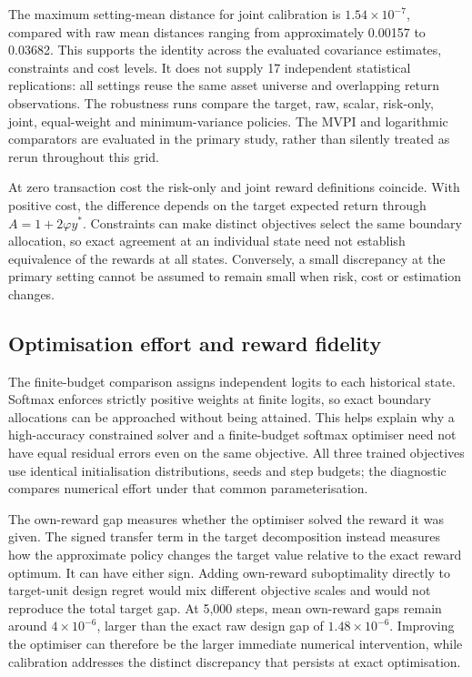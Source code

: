\documentclass[sigconf,anonymous,review]{acmart}
\begin{document}
The maximum setting-mean distance for joint calibration is $1.54\times10^{-7}$, compared with raw mean distances ranging from approximately 0.00157 to 0.03682. This supports the identity across the evaluated covariance estimates, constraints and cost levels. It does not supply 17 independent statistical replications: all settings reuse the same asset universe and overlapping return observations. The robustness runs compare the target, raw, scalar, risk-only, joint, equal-weight and minimum-variance policies. The MVPI and logarithmic comparators are evaluated in the primary study, rather than silently treated as rerun throughout this grid.

At zero transaction cost the risk-only and joint reward definitions coincide. With positive cost, the difference depends on the target expected return through $A=1+2\varphi y^*$. Constraints can make distinct objectives select the same boundary allocation, so exact agreement at an individual state need not establish equivalence of the rewards at all states. Conversely, a small discrepancy at the primary setting cannot be assumed to remain small when risk, cost or estimation changes.

\subsection{Optimisation effort and reward fidelity}
The finite-budget comparison assigns independent logits to each historical state. Softmax enforces strictly positive weights at finite logits, so exact boundary allocations can be approached without being attained. This helps explain why a high-accuracy constrained solver and a finite-budget softmax optimiser need not have equal residual errors even on the same objective. All three trained objectives use identical initialisation distributions, seeds and step budgets; the diagnostic compares numerical effort under that common parameterisation.

The own-reward gap measures whether the optimiser solved the reward it was given. The signed transfer term in the target decomposition instead measures how the approximate policy changes the target value relative to the exact reward optimum. It can have either sign. Adding own-reward suboptimality directly to target-unit design regret would mix different objective scales and would not reproduce the total target gap. At 5,000 steps, mean own-reward gaps remain around $4\times10^{-6}$, larger than the exact raw design gap of $1.48\times10^{-6}$. Improving the optimiser can therefore be the larger immediate numerical intervention, while calibration addresses the distinct discrepancy that persists at exact optimisation.
\end{document}
